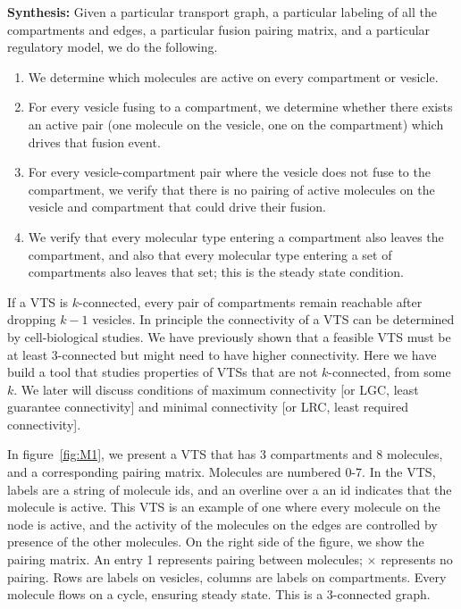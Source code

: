 \textbf{Synthesis:} Given a particular transport graph, a particular labeling of all the compartments and edges, a particular fusion pairing matrix, and a particular regulatory model, we do the following.

\begin{enumerate}
\item We determine which molecules are active on every compartment or vesicle.
\item For every vesicle fusing to a compartment, we determine whether there exists an active pair (one molecule on the vesicle, one on the compartment) which drives that fusion event.
\item For every vesicle-compartment pair where the vesicle does not fuse to the compartment, we verify that there is no pairing of active molecules on the
vesicle and compartment that could drive their fusion.
\item We verify that every molecular type entering a compartment also leaves the compartment, and also that every molecular type entering a set of compartments also leaves that set; this is the steady state condition.
\end{enumerate}

If a VTS is $k$-connected, every pair of compartments remain reachable after dropping $k-1$ vesicles. In principle the connectivity of a VTS can be determined by cell-biological studies. We have previously shown \cite{shukla} that a feasible VTS must be at least 3-connected but might need to have higher connectivity. Here we have build a tool that studies properties of VTSs that are not $k$-connected, from some $k$. We later will discuss conditions of maximum connectivity [or LGC, least guarantee connectivity] and minimal connectivity [or LRC, least required connectivity].



\begin{example}
%
In figure~\ref{fig:M1}, we present a VTS that has 3 compartments and 8 molecules, and a corresponding pairing matrix. Molecules are numbered 0-7. In the VTS, labels are a string of molecule ids, and an overline over a an id indicates that the molecule is active. This VTS is an example of one where every molecule on the node is active, and the activity of the molecules on the edges are controlled by presence of the other molecules. On the right side of the figure, we show the pairing matrix. An entry 1 represents pairing between molecules; $\times$ represents no pairing. Rows are labels on vesicles, columns are labels on compartments. Every molecule flows on a cycle, ensuring steady state. This is a 3-connected graph.
\end{example}

